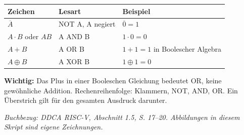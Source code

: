 \documentclass[10pt,a4paper]{article}
\newcommand{\block}[1]{\par\vspace{2mm}{\sffamily\large\bfseries #1}\par}
\newcommand{\source}[1]{\par{\footnotesize\itshape Buchbezug: #1. Abbildungen in diesem Skript sind eigene Zeichnungen.}}
\begin{document}
\block{Die Zeichen richtig lesen}
\begin{center}
\begin{tabular}{lll}\toprule
Zeichen&Lesart&Beispiel\\\midrule
$\overline A$&NOT A, A negiert&$\overline0=1$\\
$A\cdot B$ oder $AB$&A AND B&$1\cdot0=0$\\
$A+B$&A OR B&$1+1=1$ in Boolescher Algebra\\
$A\oplus B$&A XOR B&$1\oplus1=0$\\\bottomrule
\end{tabular}
\end{center}
\textbf{Wichtig:} Das Plus in einer Booleschen Gleichung bedeutet OR, keine
gewöhnliche Addition. Rechenreihenfolge: Klammern, NOT, AND, OR.
Ein Überstrich gilt für den gesamten Ausdruck darunter.
\source{DDCA RISC-V, Abschnitt 1.5, S. 17--20}
\end{document}
